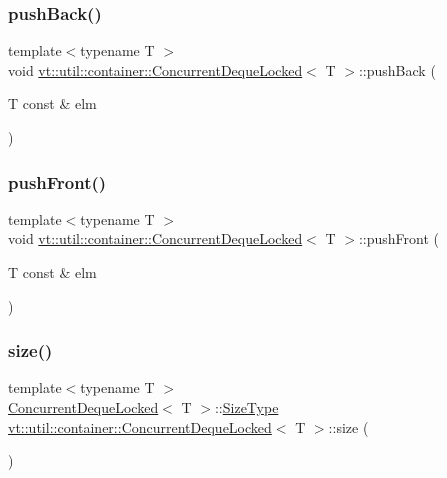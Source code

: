 \subsubsection{\texorpdfstring{push\+Back()}{pushBack()}}
{\footnotesize\ttfamily template$<$typename T $>$ \\
void \hyperlink{structvt_1_1util_1_1container_1_1_concurrent_deque_locked}{vt\+::util\+::container\+::\+Concurrent\+Deque\+Locked}$<$ T $>$\+::push\+Back (\begin{DoxyParamCaption}\item[{T const \&}]{elm }\end{DoxyParamCaption})}

\mbox{\label{structvt_1_1util_1_1container_1_1_concurrent_deque_locked_a5bfd4d329adde2c68c2c1cbc13f98ff4}} 
\subsubsection{\texorpdfstring{push\+Front()}{pushFront()}}
{\footnotesize\ttfamily template$<$typename T $>$ \\
void \hyperlink{structvt_1_1util_1_1container_1_1_concurrent_deque_locked}{vt\+::util\+::container\+::\+Concurrent\+Deque\+Locked}$<$ T $>$\+::push\+Front (\begin{DoxyParamCaption}\item[{T const \&}]{elm }\end{DoxyParamCaption})}

\mbox{\label{structvt_1_1util_1_1container_1_1_concurrent_deque_locked_abf19557ef8b6483fd821f7c7fd184153}} 
\subsubsection{\texorpdfstring{size()}{size()}}
{\footnotesize\ttfamily template$<$typename T $>$ \\
\hyperlink{structvt_1_1util_1_1container_1_1_concurrent_deque_locked}{Concurrent\+Deque\+Locked}$<$ T $>$\+::\hyperlink{structvt_1_1util_1_1container_1_1_concurrent_deque_locked_a6f35f4923f1329d25378656b0582e916}{Size\+Type} \hyperlink{structvt_1_1util_1_1container_1_1_concurrent_deque_locked}{vt\+::util\+::container\+::\+Concurrent\+Deque\+Locked}$<$ T $>$\+::size (\begin{DoxyParamCaption}{ }\end{DoxyParamCaption})}



